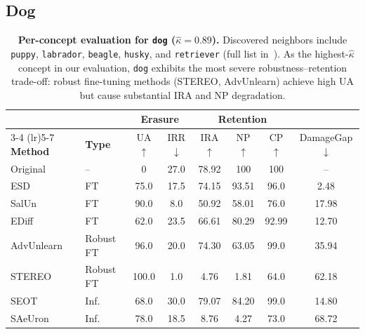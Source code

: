 
\subsection{Dog}
\label{app:per_concept_dog}

\begin{table}[ht]
\centering
\small
\setlength{\tabcolsep}{5pt}
\begin{tabular}{llcccccc}
\toprule
& & \multicolumn{2}{c}{\textbf{Erasure}} & \multicolumn{3}{c}{\textbf{Retention}} & \\
\cmidrule(lr){3-4} \cmidrule(lr){5-7}
\textbf{Method} & \textbf{Type} & UA$\uparrow$ & IRR$\downarrow$ & IRA$\uparrow$ & NP$\uparrow$ & CP$\uparrow$ & DamageGap$\downarrow$ \\
\midrule
Original    & --          & 0     & 27.0  & 78.92 & 100   & 100   & --    \\
\midrule
ESD         & FT          & 75.0  & 17.5  & 74.15 & 93.51 & 96.0  & 2.48  \\
SalUn       & FT          & 90.0  & 8.0   & 50.92 & 58.01 & 76.0  & 17.98 \\
EDiff       & FT          & 62.0  & 23.5  & 66.61 & 80.29 & 92.99 & 12.70 \\
\midrule
AdvUnlearn  & Robust FT   & 96.0  & 20.0  & 74.30 & 63.05 & 99.0  & 35.94 \\
STEREO      & Robust FT   & 100.0 & 1.0   & 4.76  & 1.81  & 64.0  & 62.18 \\
\midrule
SEOT        & Inf.        & 68.0  & 30.0  & 79.07 & 84.20 & 99.0  & 14.80 \\
SAeUron     & Inf.        & 78.0  & 18.5  & 8.76  & 4.27  & 73.0  & 68.72 \\
\bottomrule
\end{tabular}
\caption{\textbf{Per-concept evaluation for \texttt{dog} ($\hat\kappa = 0.89$).} Discovered neighbors include 
\texttt{puppy}, \texttt{labrador}, \texttt{beagle}, \texttt{husky}, and \texttt{retriever} (full list in~). As the highest-$\hat\kappa$ concept in our evaluation, \texttt{dog} exhibits the most severe robustness--retention trade-off: robust fine-tuning methods (STEREO, AdvUnlearn) achieve high UA but cause substantial IRA and NP degradation.}
\label{tab:per_concept_dog}
\end{table}

